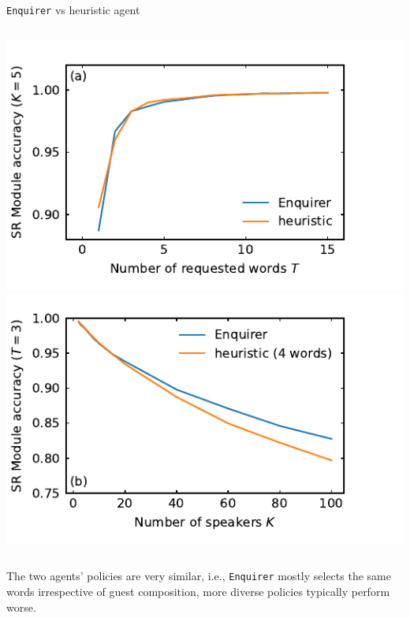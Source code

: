 \documentclass[11pt, aspectratio=169]{beamer}
\newcommand{\enquirer}{\texttt{Enquirer}}
\newcommand{\vimgscale}{0.8}
\begin{document}
\begin{frame}[t]{\enquirer{} vs heuristic agent}
    \begin{columns}
        \centering
        \includegraphics[scale=\vimgscale]{../plots/word_sweep_heuristic.pdf}
        \includegraphics[scale=\vimgscale]{../plots/guest_sweep_heuristic.pdf}
    \end{columns}

    The two agents' policies are very similar, i.e., \enquirer{} mostly selects
    the same words irrespective of guest composition, more diverse policies
    typically perform worse.
\end{frame}
\end{document}
